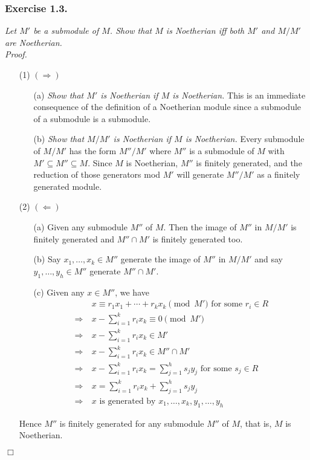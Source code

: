 \documentclass{article}
\begin{document}



\subsubsection*{Exercise 1.3.}
\emph{Let $M'$ be a submodule of $M$.
Show that $M$ is Noetherian iff both $M'$ and $M/M'$ are Noetherian.} \\

\emph{Proof.}
\begin{enumerate}
\item[(1)]
$(\Longrightarrow)$
  \begin{enumerate}
  \item[(a)]
  \emph{Show that $M'$ is Noetherian if $M$ is Noetherian.}
  This is an immediate consequence of the definition of a Noetherian module
  since a submodule of a submodule is a submodule.
  \item[(b)]
  \emph{Show that $M/M'$ is Noetherian if $M$ is Noetherian.}
  Every submodule of $M/M'$ has the form $M''/M'$
  where $M''$ is a submodule of $M$ with $M' \subseteq M'' \subseteq M$.
  Since $M$ is Noetherian, $M''$ is finitely generated,
  and the reduction of those generators mod $M'$ will generate $M''/M'$
  as a finitely generated module.
  \end{enumerate}
\item[(2)]
$(\Longleftarrow)$
  \begin{enumerate}
  \item[(a)]
  Given any submodule $M''$ of $M$.
  Then the image of $M''$ in $M/M'$ is finitely generated and
  $M'' \cap M'$ is finitely generated too.
  \item[(b)]
  Say $x_1, \ldots, x_k \in M''$ generate the image of $M''$ in $M/M'$ and
  say $y_1, \ldots, y_h \in M''$ generate $M'' \cap M'$.
  \item[(c)]
  Given any $x \in M''$, we have
  \begin{align*}
  &\: x \equiv r_1 x_1 + \cdots + r_k x_k \pmod{M'} \text{ for some } r_i \in R \\
  \Longrightarrow&\:
  x - \sum_{i=1}^{k} r_i x_k \equiv 0 \pmod{M'} \\
  \Longrightarrow&\:
  x - \sum_{i=1}^{k} r_i x_k \in M' \\
  \Longrightarrow&\:
  x - \sum_{i=1}^{k} r_i x_k \in M'' \cap M' \\
  \Longrightarrow&\:
  x - \sum_{i=1}^{k} r_i x_k = \sum_{j=1}^{h} s_j y_j \text{ for some } s_j \in R \\
  \Longrightarrow&\:
  x = \sum_{i=1}^{k} r_i x_k + \sum_{j=1}^{h} s_j y_j \\
  \Longrightarrow&\:
  \text{$x$ is generated by $x_1, \ldots, x_k, y_1, \ldots, y_h$}
  \end{align*}
  \end{enumerate}
  Hence $M''$ is finitely generated for any submodule $M''$ of $M$,
  that is, $M$ is Noetherian.
\end{enumerate}
$\Box$ \\\\
\end{document}
